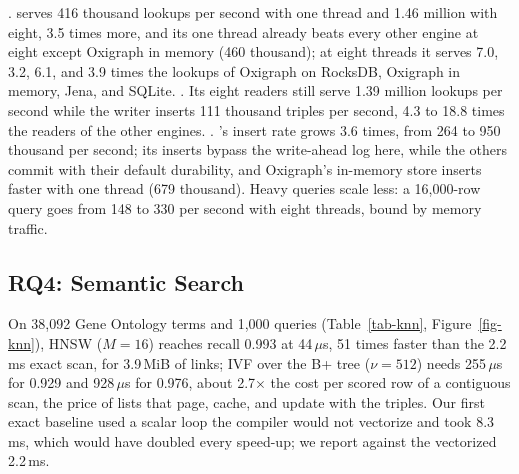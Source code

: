 .
\sys serves 416 thousand lookups per second with one thread and 1.46 million with
eight, 3.5 times more, and its one thread already beats every other engine at
eight except Oxigraph in memory (460 thousand); at eight threads it serves 7.0,
3.2, 6.1, and 3.9 times the lookups of Oxigraph on RocksDB, Oxigraph in memory,
Jena, and SQLite.
.
Its eight readers still serve 1.39 million lookups per second while the writer
inserts 111 thousand triples per second, 4.3 to 18.8 times the readers of the
other engines.
.
\sys's insert rate grows 3.6 times, from 264 to 950 thousand per second; its
inserts bypass the write-ahead log here, while the others commit with their
default durability, and Oxigraph's in-memory store inserts faster with one thread
(679 thousand).
Heavy queries scale less: a 16,000-row query goes from 148 to 330 per second
with eight threads, bound by memory traffic.

\subsection{RQ4: Semantic Search}





On 38,092 Gene Ontology terms and 1,000 queries (Table~\ref{tab-knn}, Figure~\ref{fig-knn}), HNSW ($M{=}16$) reaches recall
0.993 at 44\,$\mu$s, 51 times faster than the 2.2\,ms exact scan, for 3.9\,MiB of
links; IVF over the B+ tree ($\nu{=}512$) needs 255\,$\mu$s for 0.929 and
928\,$\mu$s for 0.976, about 2.7$\times$ the cost per scored row of a contiguous
scan, the price of lists that page, cache, and update with the triples.
Our first exact baseline used a scalar loop the compiler would not vectorize and
took 8.3\,ms, which would have doubled every speed-up; we report against the
vectorized 2.2\,ms.

\begin{table}[t]
\caption{Ten nearest terms under a class $c$: recall@10 / $\mu$s per query, for a query inside or outside $c$ and classes with at most 10 or more than 5,000 members (Gene Ontology). Bold marks the fastest exact or near-exact strategy.}
\label{tab-hybrid}
\small
{}
\end{table}


